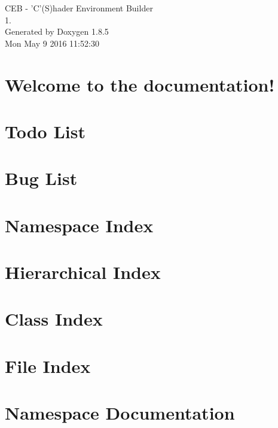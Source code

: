 \documentclass[twoside]{book}
\newcommand{\clearemptydoublepage}{%
  \newpage{\pagestyle{empty}\cleardoublepage}%
}
\begin{document}
\begin{titlepage}
\vspace*{7cm}
\begin{center}%
{\Large C\-E\-B -\/ 'C'(S)hader Environment Builder \\[1ex]\large 1. }\\
\vspace*{1cm}
{\large Generated by Doxygen 1.8.5}\\
\vspace*{0.5cm}
{\small Mon May 9 2016 11:52:30}\\
\end{center}
\end{titlepage}
\clearemptydoublepage
\tableofcontents
\clearemptydoublepage
{}

\chapter{Welcome to the documentation!}
\label{index}
\chapter{Todo List}
\label{todo}

\chapter{Bug List}
\label{bug}

\chapter{Namespace Index}

\chapter{Hierarchical Index}

\chapter{Class Index}

\chapter{File Index}

\chapter{Namespace Documentation}



\end{document}
